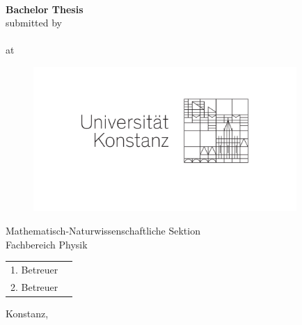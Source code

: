 

\begin{titlepage}
	\begin{center}
	
		{\LARGE\textbf{\BAtitle}}
		\vspace{12ex} \\
		{\LARGE\textbf{Bachelor Thesis}}
		\vspace{8ex}\\
		
		{\Large{submitted by}}
		\vspace{0ex}\\
		{\Large\textbf{\BAauthor}}
		\vspace{8ex}\\
		
		at\\
		\begin{figure}[htpb]
		\centering
		\includegraphics[width=10cm]{Titelseite/Universitaetslogo.pdf}
		\end{figure}
		
		Mathematisch-Naturwissenschaftliche Sektion\\
		Fachbereich Physik
		\vspace{8ex}\\
		
		\begin{table}[h]
		\centering
		
		\begin{tabular}{ll}
		1. Betreuer & \BAreaderone \\
		2. Betreuer & \BAreadertwo \\
		\end{tabular}
		\end{table}
		
		\vfill
		Konstanz, \BAyear
	\end{center}
\end{titlepage}
\pagestyle{empty}


\newpage

